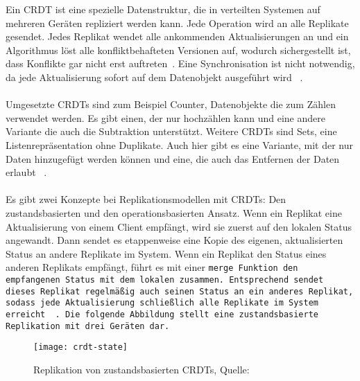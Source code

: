 %
%
Ein \gls{CRDT} ist eine spezielle Datenstruktur, die in verteilten Systemen auf mehreren Geräten repliziert werden kann. Jede Operation wird an alle Replikate gesendet. Jedes Replikat wendet alle ankommenden Aktualisierungen an und ein Algorithmus löst alle konfliktbehafteten Versionen auf, wodurch sichergestellt ist, dass Konflikte gar nicht erst auftreten~\cite{crdt_shapiro}. Eine Synchronisation ist nicht notwendig, da jede Aktualisierung sofort auf dem Datenobjekt ausgeführt wird ~\cite{crdt_shapiro2}.\\\\
%
%
Umgesetzte \glspl{CRDT} sind zum Beispiel Counter, Datenobjekte die zum Zählen verwendet werden. Es gibt einen, der nur hochzählen kann und eine andere Variante die auch die Subtraktion unterstützt.
Weitere \glspl{CRDT} sind Sets, eine Listenrepräsentation ohne Duplikate. Auch hier gibt es eine Variante, mit der nur Daten hinzugefügt werden können und eine, die auch das Entfernen der Daten erlaubt ~\cite{crdt_shapiro}.\\\\
%
Es gibt zwei Konzepte bei Replikationsmodellen mit \glspl{CRDT}: Den zustandsbasierten und den operationsbasierten Ansatz.
%
Wenn ein Replikat eine Aktualisierung von einem Client empfängt, wird sie zuerst auf den lokalen Status angewandt.
Dann sendet es etappenweise eine Kopie des eigenen, aktualisierten Status an andere Replikate im System.
Wenn ein Replikat den Status eines anderen Replikats empfängt, führt es mit einer \tt{merge} Funktion den empfangenen Status mit dem lokalen zusammen.
Entsprechend sendet dieses Replikat regelmäßig auch seinen Status an ein anderes Replikat, sodass jede Aktualisierung schließlich alle Replikate im System erreicht ~\cite{crdt_shapiro2}.
Die folgende Abbildung stellt eine zustandsbasierte Replikation mit drei Geräten dar.
%
\begin{figure}[H]
  \centering
  \texttt{[image: crdt-state]}
  \grayRule
  \caption[Replikation von zustandsbasierten \glspl{CRDT}]{Replikation von zustandsbasierten \glspl{CRDT}, Quelle: ~\cite{crdt_shapiro2}}
  \label{fig:crdt-state}
\end{figure}
